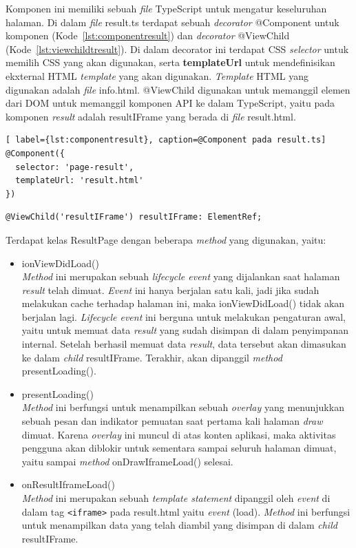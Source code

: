 \begin{enumerate}
\begin{enumerate}
		Komponen ini memiliki sebuah \textit{file} TypeScript untuk mengatur keseluruhan halaman. Di dalam \textit{file} result.ts terdapat sebuah \textit{decorator} @Component untuk komponen (Kode~\ref{lst:componentresult}) dan \textit{decorator} @ViewChild (Kode~\ref{lst:viewchildtresult}). Di dalam decorator ini terdapat CSS \textit{selector} untuk memilih CSS yang akan digunakan, serta \textbf{templateUrl} untuk mendefinisikan ekxternal HTML \textit{template} yang akan digunakan. \textit{Template} HTML yang digunakan adalah \textit{file} info.html. @ViewChild digunakan untuk memanggil elemen dari DOM untuk memanggil komponen API ke dalam TypeScript, yaitu pada komponen \textit{result} adalah resultIFrame yang berada di \textit{file} result.html.
	
\begin{lstlisting}[ label={lst:componentresult}, caption=@Component pada result.ts]
@Component({
  selector: 'page-result',
  templateUrl: 'result.html'
})
\end{lstlisting} 

\begin{lstlisting}[label={lst:viewchildtresult}, caption=@ViewChild pada result.ts]
@ViewChild('resultIFrame') resultIFrame: ElementRef;
\end{lstlisting} 
\newpage
	Terdapat kelas ResultPage dengan beberapa \textit{method} yang digunakan, yaitu:
	
	\begin{itemize}
		\item ionViewDidLoad() \\
		\textit{Method} ini merupakan sebuah \textit{lifecycle event} yang dijalankan saat halaman \textit{result} telah dimuat. \textit{Event} ini hanya berjalan satu kali, jadi jika sudah melakukan cache terhadap halaman ini, maka ionViewDidLoad() tidak akan berjalan lagi. \textit{Lifecycle event} ini berguna untuk melakukan pengaturan awal, yaitu untuk memuat data \textit{result} yang sudah disimpan di dalam penyimpanan internal. Setelah berhasil memuat data \textit{result}, data tersebut akan dimasukan ke dalam \textit{child} resultIFrame. Terakhir, akan dipanggil \textit{method} presentLoading().
		\item presentLoading() \\
		\textit{Method} ini berfungsi untuk menampilkan sebuah \textit{overlay} yang menunjukkan sebuah pesan dan indikator pemuatan saat pertama kali halaman \textit{draw} dimuat. Karena \textit{overlay} ini muncul di atas konten aplikasi, maka aktivitas pengguna akan diblokir untuk sementara sampai seluruh halaman dimuat, yaitu sampai \textit{method} onDrawIframeLoad() selesai. 
		\item onResultIframeLoad() \\
		\textit{Method} ini merupakan sebuah \textit{template statement} dipanggil oleh \textit{event} di dalam tag \texttt{<iframe>} pada result.html yaitu \textit{event} (load). \textit{Method} ini berfungsi untuk menampilkan data yang telah diambil yang disimpan di dalam \textit{child} resultIFrame.
	\end{itemize}
	

\end{enumerate}
\end{enumerate}

